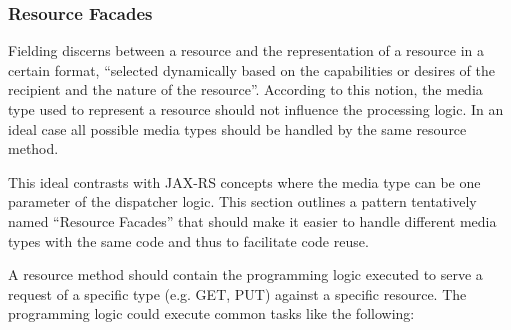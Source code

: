 \documentclass[12pt,a4paper,twoside]{scrartcl}		%
\begin{document}
\subsubsection{Resource Facades}
\label{sec:resourcefacades}
Fielding discerns between a resource and the representation of a resource in a
certain format, ``selected dynamically based on the capabilities or desires of
the recipient and the nature of the resource''\cite[p. 87]{Fielding2000}.
According to this notion, the media type used to represent a resource should not
influence the processing logic. In an ideal case all possible media types should
be handled by the same resource method.


This ideal contrasts with JAX-RS concepts where the media type can be one
parameter of the dispatcher logic. This section outlines a pattern tentatively
named ``Resource Facades'' that should make it easier to handle different media
types with the same code and thus to facilitate code reuse.


A resource method should contain the programming logic executed to serve a
request of a specific type (e.g. GET, PUT) against a specific resource. The
programming logic could execute common tasks like the following:
\end{document}

